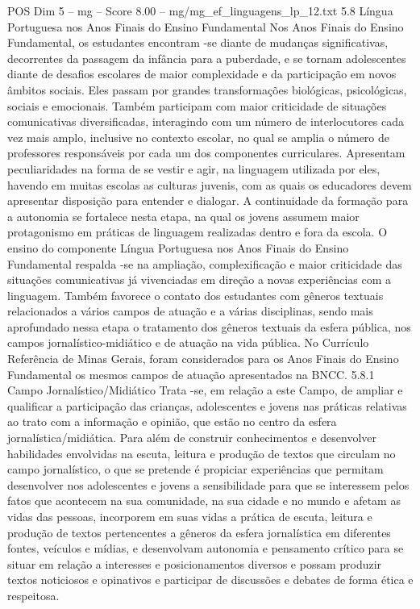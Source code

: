 \begin{textsample}{POS Dim 5 – mg – Score 8.00 – mg/mg\_ef\_linguagens\_lp\_12.txt}  \label{ex:f5_pos_183}
5.8 Língua Portuguesa nos Anos Finais do Ensino Fundamental Nos Anos Finais do Ensino Fundamental, os estudantes encontram -se diante de mudanças significativas, decorrentes da passagem da infância para a puberdade, e se tornam adolescentes diante de desafios escolares de maior complexidade e da participação em novos âmbitos sociais.
Eles passam por grandes transformações biológicas, psicológicas, sociais e emocionais.
Também participam com maior criticidade de situações comunicativas diversificadas, interagindo com um número de interlocutores cada vez mais amplo, inclusive no contexto escolar, no qual se amplia o número de professores responsáveis por cada um dos componentes curriculares.
Apresentam peculiaridades na forma de se vestir e agir, na linguagem utilizada por eles, havendo em muitas escolas as culturas juvenis, com as quais os educadores devem apresentar disposição para entender e dialogar.
A continuidade da formação para a autonomia se fortalece nesta etapa, na qual os jovens assumem maior protagonismo em práticas de linguagem realizadas dentro e fora da escola.
O ensino do componente Língua Portuguesa nos Anos Finais do Ensino Fundamental respalda -se na ampliação, complexificação e maior criticidade das situações comunicativas já vivenciadas em direção a novas experiências com a linguagem.
Também favorece o contato dos estudantes com gêneros textuais relacionados a vários campos de atuação e a várias disciplinas, sendo mais aprofundado nessa etapa o tratamento dos gêneros textuais da esfera pública, nos campos jornalístico-midiático e de atuação na vida pública.
No Currículo Referência de Minas Gerais, foram considerados para os Anos Finais do Ensino Fundamental os mesmos campos de atuação apresentados na BNCC. 5.8.1 Campo Jornalístico/Midiático Trata -se, em relação a este Campo, de ampliar e qualificar a participação das crianças, adolescentes e jovens nas práticas relativas ao trato com a informação e opinião, que estão no centro da esfera jornalística/midiática.
Para além de construir conhecimentos e desenvolver habilidades envolvidas na escuta, leitura e produção de textos que circulam no campo jornalístico, o que se pretende é propiciar experiências que permitam desenvolver nos adolescentes e jovens a sensibilidade para que se interessem pelos fatos que acontecem na sua comunidade, na sua cidade e no mundo e afetam as vidas das pessoas, incorporem em suas vidas a prática de escuta, leitura e produção de textos pertencentes a gêneros da esfera jornalística em diferentes fontes, veículos e mídias, e desenvolvam autonomia e pensamento crítico para se situar em relação a interesses e posicionamentos diversos e possam produzir textos noticiosos e opinativos e participar de discussões e debates de forma ética e respeitosa.

\end{textsample}
